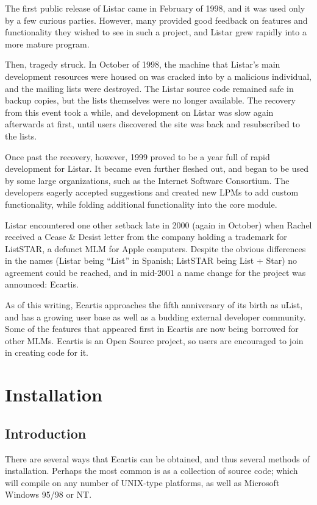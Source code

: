 \documentclass{book}
\begin{document}
The first public release of Listar came in February of 1998, and it was used
only by a few curious parties.  However, many provided good feedback on
features and functionality they wished to see in such a project, and Listar
grew rapidly into a more mature program.
   
Then, tragedy struck.  In October of 1998, the machine that Listar's main
development resources were housed on was cracked into by a malicious
individual, and the mailing lists were destroyed.  The Listar source code
remained safe in backup copies, but the lists themselves were no longer
available.  The recovery from this event took a while, and development on
Listar was slow again afterwards at first, until users discovered the site was
back and resubscribed to the lists.

Once past the recovery, however, 1999 proved to be a year full of rapid
development for Listar.  It became even further fleshed out, and began to be
used by some large organizations, such as the Internet Software Consortium.
The developers eagerly accepted suggestions and created new LPMs to add custom
functionality, while folding additional functionality into the core module.

Listar encountered one other setback late in 2000 (again in October) when
Rachel received a Cease \& Desist letter from the company holding a trademark
for ListSTAR, a defunct MLM for Apple computers.  Despite the obvious
differences in the names (Listar being ``List'' in Spanish; ListSTAR being
List + Star) no agreement could be reached, and in mid-2001 a name change for
the project was announced: Ecartis.  

As of this writing, Ecartis approaches the fifth anniversary of its birth as
uList, and has a growing user base as well as a budding external developer
community.  Some of the features that appeared first in Ecartis are now being
borrowed for other MLMs.  Ecartis is an Open Source project, so users are
encouraged to join in creating code for it.
   
\chapter{Installation}
\label{install}

\section{Introduction}
\label{install:intro}

There are several ways that Ecartis can be obtained, and thus several methods
of installation.  Perhaps the most common is as a collection of source code;
which will compile on any number of UNIX-type platforms, as well as Microsoft
Windows 95/98 or NT.
   
\end{document}
